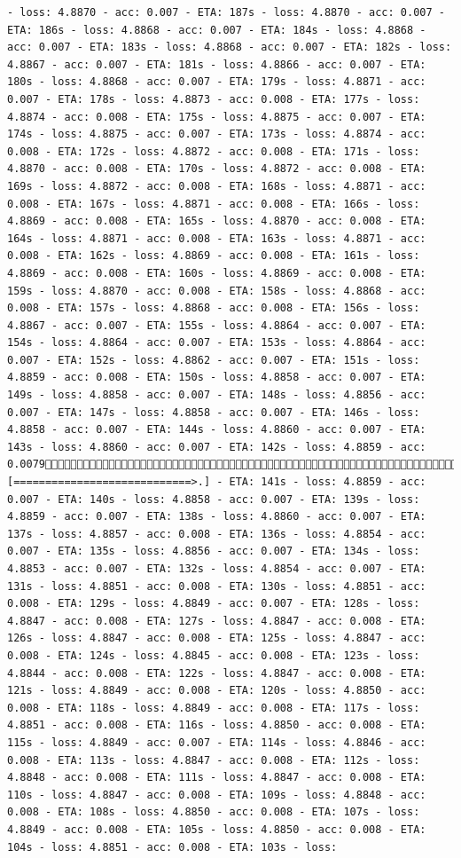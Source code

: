 \documentclass[11pt]{article}
\begin{document}
\begin{Verbatim}[commandchars=\\\{\}]
- loss: 4.8870 - acc: 0.007 - ETA: 187s - loss: 4.8870 - acc: 0.007 - ETA: 186s - loss: 4.8868 - acc: 0.007 - ETA: 184s - loss: 4.8868 - acc: 0.007 - ETA: 183s - loss: 4.8868 - acc: 0.007 - ETA: 182s - loss: 4.8867 - acc: 0.007 - ETA: 181s - loss: 4.8866 - acc: 0.007 - ETA: 180s - loss: 4.8868 - acc: 0.007 - ETA: 179s - loss: 4.8871 - acc: 0.007 - ETA: 178s - loss: 4.8873 - acc: 0.008 - ETA: 177s - loss: 4.8874 - acc: 0.008 - ETA: 175s - loss: 4.8875 - acc: 0.007 - ETA: 174s - loss: 4.8875 - acc: 0.007 - ETA: 173s - loss: 4.8874 - acc: 0.008 - ETA: 172s - loss: 4.8872 - acc: 0.008 - ETA: 171s - loss: 4.8870 - acc: 0.008 - ETA: 170s - loss: 4.8872 - acc: 0.008 - ETA: 169s - loss: 4.8872 - acc: 0.008 - ETA: 168s - loss: 4.8871 - acc: 0.008 - ETA: 167s - loss: 4.8871 - acc: 0.008 - ETA: 166s - loss: 4.8869 - acc: 0.008 - ETA: 165s - loss: 4.8870 - acc: 0.008 - ETA: 164s - loss: 4.8871 - acc: 0.008 - ETA: 163s - loss: 4.8871 - acc: 0.008 - ETA: 162s - loss: 4.8869 - acc: 0.008 - ETA: 161s - loss: 4.8869 - acc: 0.008 - ETA: 160s - loss: 4.8869 - acc: 0.008 - ETA: 159s - loss: 4.8870 - acc: 0.008 - ETA: 158s - loss: 4.8868 - acc: 0.008 - ETA: 157s - loss: 4.8868 - acc: 0.008 - ETA: 156s - loss: 4.8867 - acc: 0.007 - ETA: 155s - loss: 4.8864 - acc: 0.007 - ETA: 154s - loss: 4.8864 - acc: 0.007 - ETA: 153s - loss: 4.8864 - acc: 0.007 - ETA: 152s - loss: 4.8862 - acc: 0.007 - ETA: 151s - loss: 4.8859 - acc: 0.008 - ETA: 150s - loss: 4.8858 - acc: 0.007 - ETA: 149s - loss: 4.8858 - acc: 0.007 - ETA: 148s - loss: 4.8856 - acc: 0.007 - ETA: 147s - loss: 4.8858 - acc: 0.007 - ETA: 146s - loss: 4.8858 - acc: 0.007 - ETA: 144s - loss: 4.8860 - acc: 0.007 - ETA: 143s - loss: 4.8860 - acc: 0.007 - ETA: 142s - loss: 4.8859 - acc: 0.00796660/6680 [============================>.] - ETA: 141s - loss: 4.8859 - acc: 0.007 - ETA: 140s - loss: 4.8858 - acc: 0.007 - ETA: 139s - loss: 4.8859 - acc: 0.007 - ETA: 138s - loss: 4.8860 - acc: 0.007 - ETA: 137s - loss: 4.8857 - acc: 0.008 - ETA: 136s - loss: 4.8854 - acc: 0.007 - ETA: 135s - loss: 4.8856 - acc: 0.007 - ETA: 134s - loss: 4.8853 - acc: 0.007 - ETA: 132s - loss: 4.8854 - acc: 0.007 - ETA: 131s - loss: 4.8851 - acc: 0.008 - ETA: 130s - loss: 4.8851 - acc: 0.008 - ETA: 129s - loss: 4.8849 - acc: 0.007 - ETA: 128s - loss: 4.8847 - acc: 0.008 - ETA: 127s - loss: 4.8847 - acc: 0.008 - ETA: 126s - loss: 4.8847 - acc: 0.008 - ETA: 125s - loss: 4.8847 - acc: 0.008 - ETA: 124s - loss: 4.8845 - acc: 0.008 - ETA: 123s - loss: 4.8844 - acc: 0.008 - ETA: 122s - loss: 4.8847 - acc: 0.008 - ETA: 121s - loss: 4.8849 - acc: 0.008 - ETA: 120s - loss: 4.8850 - acc: 0.008 - ETA: 118s - loss: 4.8849 - acc: 0.008 - ETA: 117s - loss: 4.8851 - acc: 0.008 - ETA: 116s - loss: 4.8850 - acc: 0.008 - ETA: 115s - loss: 4.8849 - acc: 0.007 - ETA: 114s - loss: 4.8846 - acc: 0.008 - ETA: 113s - loss: 4.8847 - acc: 0.008 - ETA: 112s - loss: 4.8848 - acc: 0.008 - ETA: 111s - loss: 4.8847 - acc: 0.008 - ETA: 110s - loss: 4.8847 - acc: 0.008 - ETA: 109s - loss: 4.8848 - acc: 0.008 - ETA: 108s - loss: 4.8850 - acc: 0.008 - ETA: 107s - loss: 4.8849 - acc: 0.008 - ETA: 105s - loss: 4.8850 - acc: 0.008 - ETA: 104s - loss: 4.8851 - acc: 0.008 - ETA: 103s - loss: 
\end{Verbatim}
\end{document}
